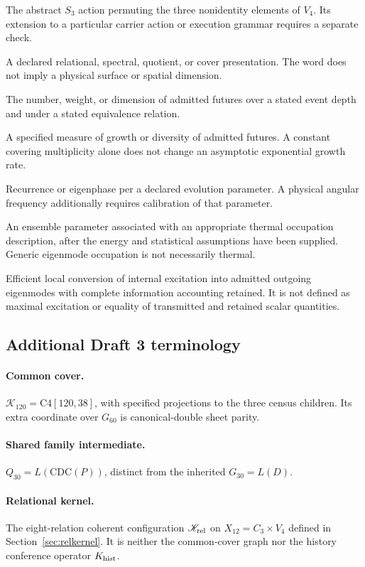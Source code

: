\begin{description}[style=nextline,leftmargin=1.5em,font=\normalfont\bfseries]
\item[Carrier triality]
The abstract $S_3$ action permuting the three nonidentity elements of $V_4$. Its extension to a particular carrier action or execution grammar requires a separate check.
\item[Sheet]
A declared relational, spectral, quotient, or cover presentation. The word does not imply a physical surface or spatial dimension.
\item[Continuation multiplicity]
The number, weight, or dimension of admitted futures over a stated event depth and under a stated equivalence relation.
\item[Continuation entropy]
A specified measure of growth or diversity of admitted futures. A constant covering multiplicity alone does not change an asymptotic exponential growth rate.
\item[Frequency]
Recurrence or eigenphase per a declared evolution parameter. A physical angular frequency additionally requires calibration of that parameter.
\item[Temperature]
An ensemble parameter associated with an appropriate thermal occupation description, after the energy and statistical assumptions have been supplied. Generic eigenmode occupation is not necessarily thermal.
\item[Balanced release]
Efficient local conversion of internal excitation into admitted outgoing eigenmodes with complete information accounting retained. It is not defined as maximal excitation or equality of transmitted and retained scalar quantities.
\end{description}

\subsection*{Additional Draft 3 terminology}
\paragraph{Common cover.} $\mathcal K_{120}=\mathrm{C4}[120,38]$, with specified projections to the three census children. Its extra coordinate over $G_{60}$ is canonical-double sheet parity.
\paragraph{Shared family intermediate.} $Q_{30}=L(\mathrm{CDC}(P))$, distinct from the inherited $G_{30}=L(D)$.
\paragraph{Relational kernel.} The eight-relation coherent configuration $\mathscr K_{\rm rel}$ on $X_{12}=C_3\times V_4$ defined in Section~\ref{sec:relkernel}. It is neither the common-cover graph nor the history conference operator $K_{\rm hist}$.
